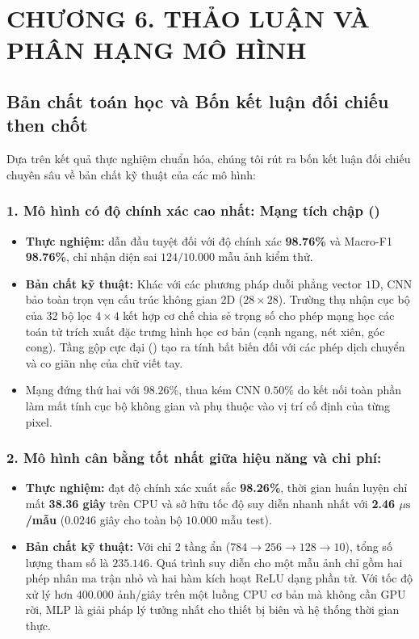 \section*{CHƯƠNG 6. THẢO LUẬN VÀ PHÂN HẠNG MÔ HÌNH}
\setcounter{section}{6}
\setcounter{subsection}{0}

\subsection{Bản chất toán học và Bốn kết luận đối chiếu then chốt}
Dựa trên kết quả thực nghiệm chuẩn hóa, chúng tôi rút ra bốn kết luận đối chiếu chuyên sâu về bản chất kỹ thuật của các mô hình:

\subsubsection{1. Mô hình có độ chính xác cao nhất: Mạng tích chập ()}
\begin{itemize}
    \item \textbf{Thực nghiệm:}  dẫn đầu tuyệt đối với độ chính xác \textbf{98.76\%} và Macro-F1 \textbf{98.76\%}, chỉ nhận diện sai $124/10.000$ mẫu ảnh kiểm thử.
    \item \textbf{Bản chất kỹ thuật:} Khác với các phương pháp duỗi phẳng vector $1\text{D}$, CNN bảo toàn trọn vẹn cấu trúc không gian 2D ($28 \times 28$). Trường thụ nhận cục bộ của 32 bộ lọc $4 \times 4$ kết hợp cơ chế chia sẻ trọng số cho phép mạng học các toán tử trích xuất đặc trưng hình học cơ bản (cạnh ngang, nét xiên, góc cong). Tầng gộp cực đại () tạo ra tính bất biến đối với các phép dịch chuyển và co giãn nhẹ của chữ viết tay.
    \item Mạng  đứng thứ hai với $98.26\%$, thua kém CNN $0.50\%$ do kết nối toàn phần làm mất tính cục bộ không gian và phụ thuộc vào vị trí cố định của từng pixel.
\end{itemize}

\subsubsection{2. Mô hình cân bằng tốt nhất giữa hiệu năng và chi phí: }
\begin{itemize}
    \item \textbf{Thực nghiệm:}  đạt độ chính xác xuất sắc \textbf{98.26\%}, thời gian huấn luyện chỉ mất \textbf{38.36 giây} trên CPU và sở hữu tốc độ suy diễn nhanh nhất với \textbf{2.46 $\mu\text{s}$/mẫu} ($0.0246$ giây cho toàn bộ $10.000$ mẫu test).
    \item \textbf{Bản chất kỹ thuật:} Với chỉ 2 tầng ẩn ($784 \rightarrow 256 \rightarrow 128 \rightarrow 10$), tổng số lượng tham số là $235.146$. Quá trình suy diễn cho một mẫu ảnh chỉ gồm hai phép nhân ma trận nhỏ và hai hàm kích hoạt ReLU dạng phần tử. Với tốc độ xử lý hơn $400.000$ ảnh/giây trên một luồng CPU cơ bản mà không cần GPU rời, MLP là giải pháp lý tưởng nhất cho thiết bị biên và hệ thống thời gian thực.
\end{itemize}

